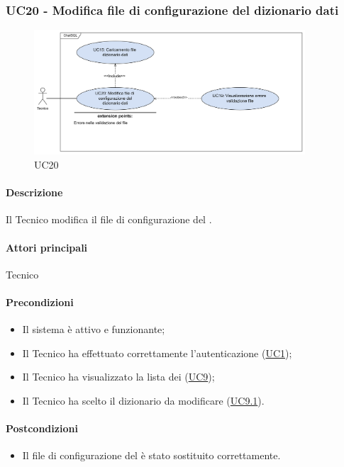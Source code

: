 \subsubsection{UC20 - Modifica file di configurazione del dizionario dati}\label{UC20}

\begin{figure}[H]
  \centering
  \includegraphics[width=0.90\textwidth]{assets/uc20.png}
  \caption{UC20}
\end{figure}

\paragraph*{Descrizione}
Il Tecnico modifica il file di configurazione del . 

\paragraph*{Attori principali}
Tecnico

\paragraph*{Precondizioni}
\begin{itemize}
  \item Il sistema è attivo e funzionante;
  \item Il Tecnico ha effettuato correttamente l'autenticazione (\hyperref[UC1]{UC1});
  \item Il Tecnico ha visualizzato la lista dei  (\hyperref[UC9]{UC9});
  \item Il Tecnico ha scelto il dizionario da modificare (\hyperref[UC9.1]{UC9.1}).
\end{itemize}

\paragraph*{Postcondizioni}
\begin{itemize}
  \item Il file di configurazione del  è stato sostituito correttamente.
\end{itemize}

